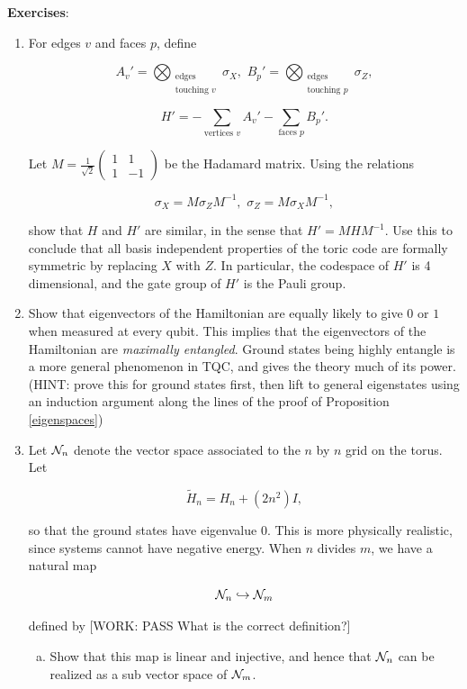 \documentclass{article}
\theoremstyle{definition}
\numberwithin{figure}{section}
\begin{document}
\large \textbf{Exercises}:\normalsize

\begin{enumerate}[\thesection .1.]
\item For edges $v$ and faces $p$, define

$$A_v'=\bigotimes_{\substack{\text{edges} \\ \text{touching }v}}\sigma_X,\,\, B_p'=\bigotimes_{\substack{\text{edges} \\ \text{touching }p}}\sigma_Z,$$

$$H'=-\sum_{\text{vertices }v}A_v'-\sum_{\text{faces }p}B_p'.$$

Let $M=\frac{1}{\sqrt{2}}
\begin{pmatrix}
1 & 1 \\
1 & -1
\end{pmatrix}$ be the Hadamard matrix. Using the relations

$$\sigma_X=M\sigma_ZM^{-1},\,\, \sigma_{Z}=M\sigma_X M^{-1},$$

show that $H$ and $H'$ are similar, in the sense that $H'=MHM^{-1}$. Use this to conclude that all basis independent properties of the toric code are formally symmetric by replacing $X$ with $Z$. In particular, the codespace of $H'$ is 4 dimensional, and the gate group of $H'$ is the Pauli group.


\item Show that eigenvectors of the Hamiltonian are equally likely to give $0$ or $1$ when measured at every qubit. This implies that the eigenvectors of the Hamiltonian are \textit{maximally entangled}. Ground states being highly entangle is a more general phenomenon in TQC, and gives the theory much of its power. (HINT: prove this for ground states first, then lift to general eigenstates using an induction argument along the lines of the proof of Proposition \ref{eigenspaces})

\item Let $\mathcal{N}_{n}$ denote the vector space associated to the $n$ by $n$ grid on the torus. Let

$$\tilde{H}_n=H_n+(2n^2)I,$$

so that the ground states have eigenvalue $0$. This is more physically realistic, since systems cannot have negative energy. When $n$ divides $m$, we have a natural map

$$\mathcal{N}_{n}\hookrightarrow{}\mathcal{N}_{m}$$

defined by [WORK: PASS What is the correct definition?]

\begin{enumerate}[(a)]
\item Show that this map is linear and injective, and hence that $\mathcal{N}_{n}$ can be realized as a sub vector space of $\mathcal{N}_{m}$.


\end{enumerate}
\end{enumerate}
\end{document}
